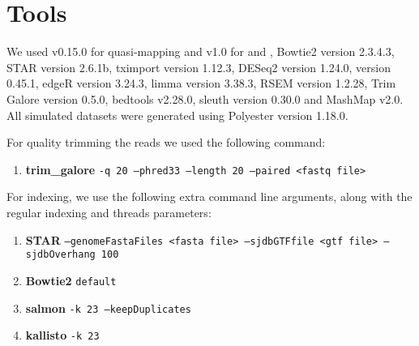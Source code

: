 \section{Tools}
\label{subsec:commands}
We used \salmon v0.15.0 for quasi-mapping and \salmon v1.0 for \hsa and \saf, Bowtie2 version 2.3.4.3, STAR version 2.6.1b, tximport
version 1.12.3, DESeq2 version 1.24.0, \kallisto version 0.45.1, edgeR version 3.24.3, limma version 3.38.3, 
RSEM version 1.2.28, Trim Galore version 0.5.0, bedtools v2.28.0, sleuth version 0.30.0 and
MashMap v2.0. All simulated datasets were generated using Polyester version 1.18.0.

For quality trimming the reads we used the following command:
\raggedright
\begin{enumerate}
\item \textbf{trim\_galore} \texttt{-q 20 --phred33 --length 20 --paired <fastq file>}
\end{enumerate}

For indexing, we use the following extra command line arguments, along with the regular
indexing and threads parameters:
\begin{enumerate}
\item \textbf{STAR} \texttt{--genomeFastaFiles <fasta file> --sjdbGTFfile <gtf file> --sjdbOverhang 100}
\item \textbf{Bowtie2} \texttt{default}
\item \textbf{salmon} \texttt{-k 23 --keepDuplicates}
\item \textbf{kallisto} \texttt{-k 23}
\end{enumerate}


